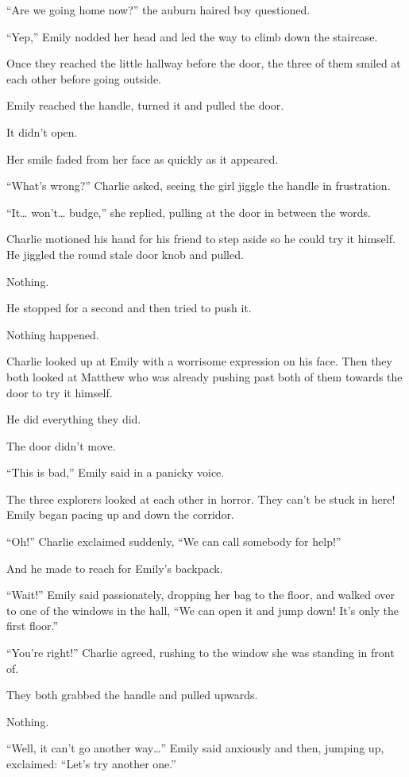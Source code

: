 “Are we going home now?” the auburn haired boy questioned.

“Yep,” Emily nodded her head and led the way to climb down the staircase.

Once they reached the little hallway before the door, the three of them smiled at each other before going outside.

Emily reached the handle, turned it and pulled the door.

It didn’t open.

Her smile faded from her face as quickly as it appeared.

“What’s wrong?” Charlie asked, seeing the girl jiggle the handle in frustration.

“It… won’t… budge,” she replied, pulling at the door in between the words.

Charlie motioned his hand for his friend to step aside so he could try it himself. He jiggled the round stale door knob and pulled.

Nothing.

He stopped for a second and then tried to push it.

Nothing happened.

Charlie looked up at Emily with a worrisome expression on his face. Then they both looked at Matthew who was already pushing past both of them towards the door to try it himself.

He did everything they did.

The door didn’t move.

“This is bad,” Emily said in a panicky voice.

The three explorers looked at each other in horror. They can’t be stuck in here! Emily began pacing up and down the corridor.

“Oh!” Charlie exclaimed suddenly, “We can call somebody for help!”

And he made to reach for Emily’s backpack.

“Wait!” Emily said passionately, dropping her bag to the floor, and walked over to one of the windows in the hall, “We can open it and jump down! It’s only the first floor.”

“You’re right!” Charlie agreed, rushing to the window she was standing in front of.

They both grabbed the handle and pulled upwards.

Nothing.

“Well, it can’t go another way…” Emily said anxiously and then, jumping up, exclaimed: “Let’s try another one.”


